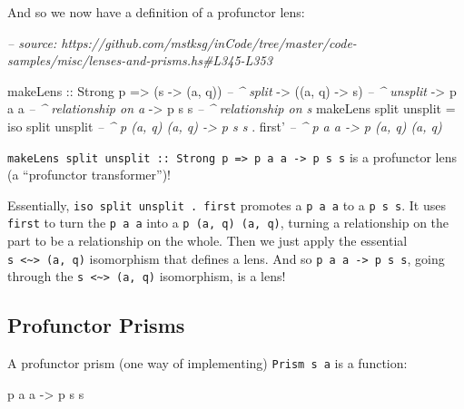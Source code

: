 \documentclass[]{article}
\newenvironment{Shaded}{}{}
\newcommand{\CommentTok}[1]{\textcolor[rgb]{0.38,0.63,0.69}{\textit{#1}}}
\newcommand{\DataTypeTok}[1]{\textcolor[rgb]{0.56,0.13,0.00}{#1}}
\newcommand{\FunctionTok}[1]{\textcolor[rgb]{0.02,0.16,0.49}{#1}}
\newcommand{\NormalTok}[1]{#1}
\newcommand{\OtherTok}[1]{\textcolor[rgb]{0.00,0.44,0.13}{#1}}
\begin{document}
And so we now have a definition of a profunctor lens:

\begin{Shaded}
\begin{Highlighting}[]
\CommentTok{-- source: https://github.com/mstksg/inCode/tree/master/code-samples/misc/lenses-and-prisms.hs#L345-L353}

\NormalTok{makeLens}
\OtherTok{    ::} \DataTypeTok{Strong}\NormalTok{ p}
    \OtherTok{=>}\NormalTok{ (s }\OtherTok{->}\NormalTok{ (a, q))        }\CommentTok{-- ^ split}
    \OtherTok{->}\NormalTok{ ((a, q) }\OtherTok{->}\NormalTok{ s)        }\CommentTok{-- ^ unsplit}
    \OtherTok{->}\NormalTok{ p a a                }\CommentTok{-- ^ relationship on a}
    \OtherTok{->}\NormalTok{ p s s                }\CommentTok{-- ^ relationship on s}
\NormalTok{makeLens split unsplit }\FunctionTok{=}
\NormalTok{    iso split unsplit  }\CommentTok{-- ^ p (a, q) (a, q) -> p s s}
  \FunctionTok{.}\NormalTok{ first'             }\CommentTok{-- ^ p a a -> p (a, q) (a, q)}
\end{Highlighting}
\end{Shaded}

\texttt{makeLens\ split\ unsplit\ ::\ Strong\ p\ =\textgreater{}\ p\ a\ a\ -\textgreater{}\ p\ s\ s}
is a profunctor lens (a ``profunctor transformer'')!

Essentially, \texttt{iso\ split\ unsplit\ .\ first\textquotesingle{}} promotes a
\texttt{p\ a\ a} to a \texttt{p\ s\ s}. It uses \texttt{first\textquotesingle{}}
to turn the \texttt{p\ a\ a} into a \texttt{p\ (a,\ q)\ (a,\ q)}, turning a
relationship on the part to be a relationship on the whole. Then we just apply
the essential \texttt{s\ \textless{}\textasciitilde{}\textgreater{}\ (a,\ q)}
isomorphism that defines a lens. And so
\texttt{p\ a\ a\ -\textgreater{}\ p\ s\ s}, going through the
\texttt{s\ \textless{}\textasciitilde{}\textgreater{}\ (a,\ q)} isomorphism, is
a lens!

\hypertarget{profunctor-prisms}{%
\subsection{Profunctor Prisms}\label{profunctor-prisms}}

A profunctor prism (one way of implementing)
\texttt{Prism\textquotesingle{}\ s\ a} is a function:

\begin{Shaded}
\begin{Highlighting}[]
\NormalTok{p a a }\OtherTok{->}\NormalTok{ p s s}
\end{Highlighting}
\end{Shaded}
\end{document}
